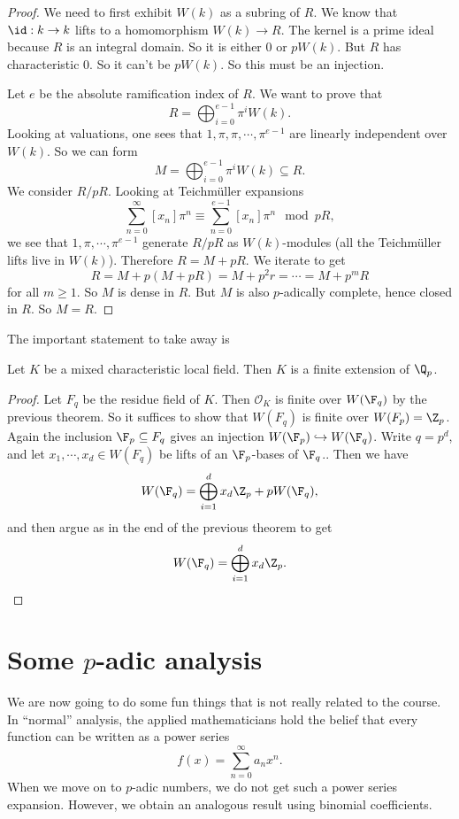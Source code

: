 \documentclass[a4paper]{article}
\begin{document}
\begin{proof}
  We need to first exhibit $W(k)$ as a subring of $R$. We know that $\id: k \to k$ lifts to a homomorphism $W(k) \to R$. The kernel is a prime ideal because $R$ is an integral domain. So it is either $0$ or $p W(k)$. But $R$ has characteristic $0$. So it can't be $pW(k)$. So this must be an injection.

  Let $e$ be the absolute ramification index of $R$. We want to prove that
  \[
    R = \bigoplus_{i = 0}^{e - 1} \pi^i W(k).
  \]
  Looking at valuations, one sees that $1, \pi, \pi, \cdots, \pi^{e - 1}$ are linearly independent over $W(k)$. So we can form
  \[
    M = \bigoplus_{i = 0}^{e - 1} \pi^i W(k) \subseteq R.
  \]
  We consider $R/pR$. Looking at Teichm\"uller expansions
  \[
    \sum_{n = 0}^\infty [x_n] \pi^n \equiv \sum_{n = 0}^{e - 1} [x_n]\pi^n \mod pR,
  \]
  we see that $1, \pi, \cdots, \pi^{e - 1}$ generate $R/pR$ as $W(k)$-modules (all the Teichm\"uller lifts live in $W(k)$). Therefore $R = M + pR$. We iterate to get
  \[
    R = M + p(M + pR) = M + p^2 r = \cdots = M + p^m R
  \]
  for all $m \geq 1$. So $M$ is dense in $R$. But $M$ is also $p$-adically complete, hence closed in $R$. So $M = R$.
\end{proof}

The important statement to take away is
\begin{cor}
  Let $K$ be a mixed characteristic local field. Then $K$ is a finite extension of $\Q_p$.
\end{cor}

\begin{proof}
  Let $F_q$ be the residue field of $K$. Then $\mathcal{O}_K$ is finite over $W(\F_q)$ by the previous theorem. So it suffices to show that $W(F_q)$ is finite over $W(F_p) = \Z_p$. Again the inclusion $\F_p \subseteq F_q$ gives an injection $W(\F_p) \hookrightarrow W(\F_q)$. Write $q = p^d$, and let $x_1, \cdots, x_d \in W(F_q)$ be lifts of an $\F_p$-bases of $\F_q$.. Then we have
  \[
    W(\F_q) = \bigoplus_{i = 1}^d x_d \Z_p + p W(\F_q),
  \]
  and then argue as in the end of the previous theorem to get
  \[
    W(\F_q) = \bigoplus_{i = 1}^d x_d \Z_p.
  \]
\end{proof}

\section{Some \texorpdfstring{$p$}{p}-adic analysis}
We are now going to do some fun things that is not really related to the course. In ``normal'' analysis, the applied mathematicians hold the belief that every function can be written as a power series
\[
  f(x) = \sum_{n = 0}^\infty a_n x^n.
\]
When we move on to $p$-adic numbers, we do not get such a power series expansion. However, we obtain an analogous result using binomial coefficients.
\end{document}
